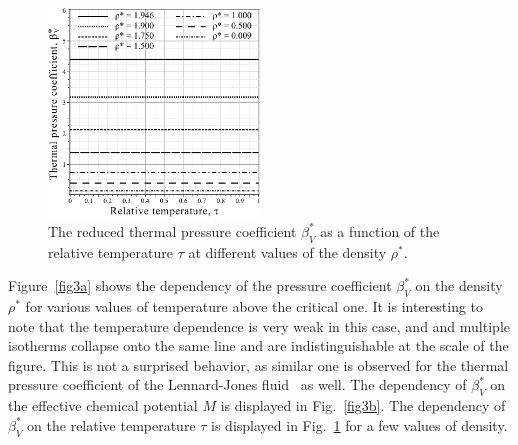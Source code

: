 \begin{figure}[h!]
	\includegraphics[width=0.5\textwidth]{f3c.pdf}
	\vskip-3mm
	\caption{The reduced thermal pressure coefficient $\beta^*_V$ as a function of the relative temperature $\tau$ at different values of the density $\rho^*$. 
	}
	\label{fig3c}
\end{figure}

Figure~\ref{fig3a} shows the dependency of the pressure coefficient $\beta^*_V$ on the density $\rho^*$ for various values of temperature above the critical one. It is interesting to note that the temperature dependence is very weak in this case, and and multiple isotherms collapse onto the same line and are indistinguishable at the scale of the figure. This is not a surprised behavior, as similar one is observed for the thermal pressure coefficient of the Lennard-Jones fluid~\cite{YigzaweSadus2013} as well. The dependency of $\beta^*_V$ on the effective chemical potential $M$ is displayed in Fig.~\ref{fig3b}. The dependency of $\beta^*_V$ on the relative temperature $\tau$ is displayed in Fig.~\ref{fig3c} for a few values of density.

